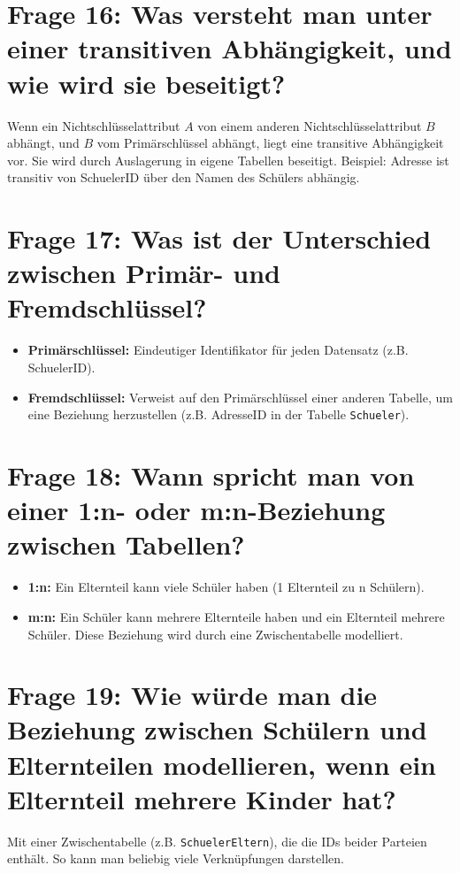 \documentclass{article}
\begin{document}
\section*{Frage 16: Was versteht man unter einer transitiven Abhängigkeit, und wie wird sie beseitigt?}
	Wenn ein Nichtschlüsselattribut $A$ von einem anderen Nichtschlüsselattribut $B$ abhängt, und $B$ vom Primärschlüssel abhängt, liegt eine transitive Abhängigkeit vor. Sie wird durch Auslagerung in eigene Tabellen beseitigt. Beispiel: Adresse ist transitiv von SchuelerID über den Namen des Schülers abhängig.
	
\section*{Frage 17: Was ist der Unterschied zwischen Primär- und Fremdschlüssel?}

	\begin{itemize}
	\item \textbf{Primärschlüssel:} Eindeutiger Identifikator für jeden Datensatz (z.B. SchuelerID).
	\item \textbf{Fremdschlüssel:} Verweist auf den Primärschlüssel einer anderen Tabelle, um eine Beziehung herzustellen (z.B. AdresseID in der Tabelle \texttt{Schueler}).
\end{itemize}

\section*{Frage 18: Wann spricht man von einer 1:n- oder m:n-Beziehung zwischen Tabellen?}
	\begin{itemize}
	\item \textbf{1:n:} Ein Elternteil kann viele Schüler haben (1 Elternteil zu n Schülern).
	\item \textbf{m:n:} Ein Schüler kann mehrere Elternteile haben und ein Elternteil mehrere Schüler. Diese Beziehung wird durch eine Zwischentabelle modelliert.
\end{itemize}

\section*{Frage 19: Wie würde man die Beziehung zwischen Schülern und Elternteilen modellieren, wenn ein Elternteil mehrere Kinder hat?}

Mit einer Zwischentabelle (z.B. \texttt{SchuelerEltern}), die die IDs beider Parteien enthält. So kann man beliebig viele Verknüpfungen darstellen.
\end{document}
